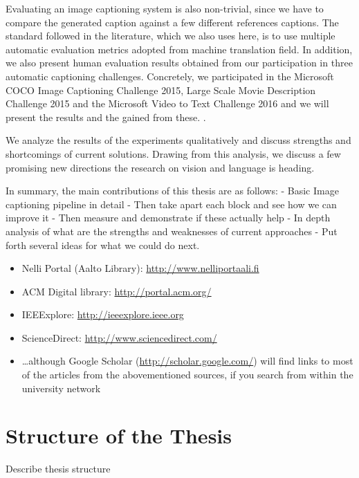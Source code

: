 Evaluating an image captioning system is also non-trivial, since we have to
compare the generated caption against a few different references captions. The
standard  followed in the literature, which we also uses here, is
to use multiple automatic evaluation metrics adopted from machine translation
field. In addition, we also present human evaluation results obtained from our
participation in three automatic captioning challenges. Concretely, we
participated in the Microsoft COCO Image Captioning Challenge 2015, Large Scale
Movie Description Challenge 2015 and the Microsoft Video to Text Challenge 2016
and we will present the results and the  gained from these.
.

We analyze the results of the experiments qualitatively and discuss strengths
and shortcomings of current solutions. Drawing from this analysis, we discuss a
few promising new directions the research on vision and language is heading.

In summary, the main contributions of this thesis are as follows:
    - Basic Image captioning pipeline in detail
    - Then take apart each block and see how we can improve it
    - Then measure and demonstrate if these actually help
    - In depth analysis of  what are the strengths and weaknesses of current
    approaches
    - Put forth several ideas for what we could do next.

\begin{itemize}
    \setlength{\itemsep}{0pt}
    \item Nelli Portal (Aalto Library): \url{http://www.nelliportaali.fi}
    \item ACM Digital library: \url{http://portal.acm.org/}
    \item IEEExplore: \url{http://ieeexplore.ieee.org}
    \item ScienceDirect: \url{http://www.sciencedirect.com/}
    \item \ldots although Google Scholar (\url{http://scholar.google.com/}) will
    find links to most of the articles from the abovementioned sources, if you
    search from within the university network
\end{itemize}


\section{Structure of the Thesis}
\label{section:structure} 
Describe thesis structure

